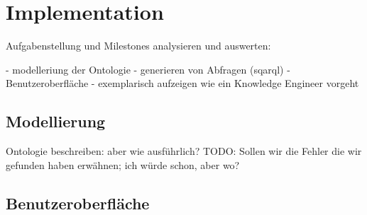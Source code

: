 \chapter{Implementation}
\label{chap:implementation}


Aufgabenstellung und Milestones analysieren und auswerten:

 - modelleriung der Ontologie
 - generieren von Abfragen (sqarql)
 - Benutzeroberfläche
 - exemplarisch aufzeigen wie ein Knowledge Engineer vorgeht
\section{Modellierung}
\label{sec:modellierung}
Ontologie beschreiben: aber wie ausführlich? 
TODO: Sollen wir die Fehler die wir gefunden haben erwähnen; ich würde schon, aber wo?


\section{Benutzeroberfläche}
\label{sec:gui}



